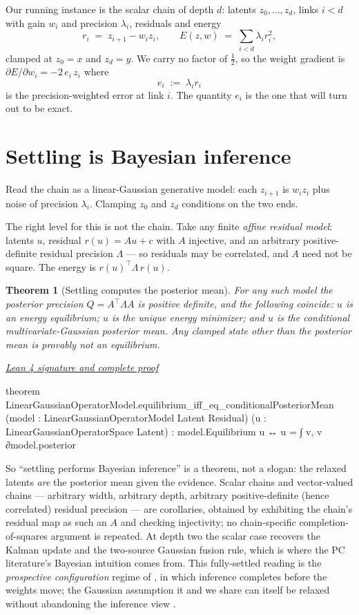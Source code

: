\documentclass[11pt]{article}
\newtheorem{theorem}{Theorem}[section]
\newcommand{\leancommit}{647168959fc57cfe97526d9525d33e63681b8e2f}
\newcommand{\leansignaturelink}[2]{%
  \par\Needspace{0.3\textheight}\smallskip\noindent
  \href{https://github.com/zariuq/MeTTapedia/blob/\leancommit/#1\#L#2}{%
    \scriptsize\itshape Lean 4 signature and complete proof}\par\nobreak}
\begin{document}
Our running instance is the scalar chain of depth $d$: latents $z_0,\dots,z_d$, links
$i < d$ with gain $w_i$ and precision $\lambda_i$, residuals and energy
\[
r_i \;=\; z_{i+1} - w_i z_i, \qquad E(z,w) \;=\; \sum_{i<d} \lambda_i r_i^2 ,
\]
clamped at $z_0 = x$ and $z_d = y$. We carry no factor of $\tfrac12$, so the weight
gradient is $\partial E/\partial w_i = -2\,e_i\,z_i$ where
\[
e_i \;:=\; \lambda_i r_i
\]
is the precision-weighted error at link $i$. The quantity $e_i$ is the one that will
turn out to be exact.

\section{Settling is Bayesian inference}

Read the chain as a linear-Gaussian generative model: each $z_{i+1}$ is $w_i z_i$ plus
noise of precision $\lambda_i$. Clamping $z_0$ and $z_d$ conditions on the two ends.

The right level for this is not the chain. Take any finite \emph{affine residual model}:
latents $u$, residual $r(u) = Au + c$ with $A$ injective, and an arbitrary
positive-definite residual precision $\Lambda$ --- so residuals may be correlated, and
$A$ need not be square. The energy is $r(u)^\top \Lambda\, r(u)$.

\begin{theorem}[Settling computes the posterior mean]\label{thm:bayes}
For any such model the posterior precision $Q = A^\top \Lambda A$ is positive definite,
and the following coincide: $u$ is an energy equilibrium; $u$ is the unique energy
minimizer; and $u$ is the conditional multivariate-Gaussian posterior mean. Any clamped
state other than the posterior mean is provably not an equilibrium.
\end{theorem}

\leansignaturelink{lean/mettapedia/Mettapedia/MachineLearning/NeuralNetworks/%
PredictiveCoding/LinearGaussianOperator.lean}{254}
\begin{leansignature}
theorem LinearGaussianOperatorModel.equilibrium_iff_eq_conditionalPosteriorMean
    (model : LinearGaussianOperatorModel Latent Residual)
    (u : LinearGaussianOperatorSpace Latent) :
    model.Equilibrium u ↔ u = ∫ v, v ∂model.posterior
\end{leansignature}

So ``settling performs Bayesian inference'' is a theorem, not a slogan: the relaxed
latents \emph{are} the posterior mean given the evidence. Scalar chains and
vector-valued chains --- arbitrary width, arbitrary depth, arbitrary positive-definite
(hence correlated) residual precision --- are corollaries, obtained by exhibiting the
chain's residual map as such an $A$ and checking injectivity; no chain-specific
completion-of-squares argument is repeated. At depth two the scalar case recovers the
Kalman update and the two-source Gaussian fusion rule, which is where the PC
literature's Bayesian intuition comes from. This fully-settled reading is the
\emph{prospective configuration} regime of \cite{millidge2023}, in which inference
completes before the weights move; the Gaussian assumption it and we share can itself be
relaxed without abandoning the inference view \cite{pinchetti2022}.
\end{document}
